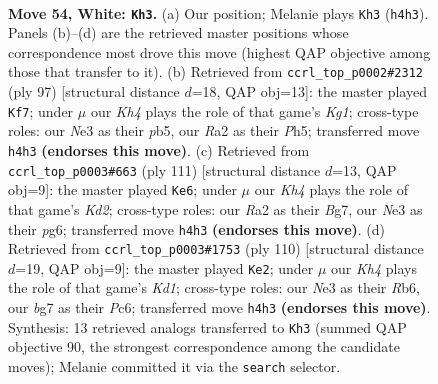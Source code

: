 \documentclass[11pt]{article}
\begin{document}
\clearpage

\begin{figure}[p]\centering
\begin{subfigure}{0.46\textwidth}\centering
\resizebox{\linewidth}{!}{%
\newchessgame
\chessboard[
  setfen={7k/1r4b1/8/8/2P4K/4N3/R7/6R1 w - - 28 54},
  showmover=false,
  pgfstyle=straightmove, color=movearrow, markmove={h4-h3}
]}
\caption{}
\end{subfigure}\hfill
\begin{subfigure}{0.46\textwidth}\centering
\resizebox{\linewidth}{!}{%
\newchessgame
\chessboard[
  setfen={6k1/8/8/1PP3Bp/5K2/8/6r1/8 b - - 0 49},
  showmover=false,
  pgfstyle=straightmove, color=movearrow, markmove={g8-f7}
]}
\caption{}
\end{subfigure}
\\[4pt]
\begin{subfigure}{0.46\textwidth}\centering
\resizebox{\linewidth}{!}{%
\newchessgame
\chessboard[
  setfen={8/3k2b1/6P1/7p/8/R3BK2/8/4r3 b - - 0 56},
  showmover=false,
  pgfstyle=straightmove, color=movearrow, markmove={d7-e6}
]}
\caption{}
\end{subfigure}\hfill
\begin{subfigure}{0.46\textwidth}\centering
\resizebox{\linewidth}{!}{%
\newchessgame
\chessboard[
  setfen={8/8/1RP1b3/2r1k3/8/4P3/8/3K4 w - - 3 56},
  showmover=false,
  pgfstyle=straightmove, color=movearrow, markmove={d1-e2}
]}
\caption{}
\end{subfigure}
\caption{\textbf{Move 54, White: \texttt{Kh3}.} (a) Our position; Melanie plays \texttt{Kh3} (\texttt{h4h3}). Panels (b)--(d) are the retrieved master positions whose correspondence most drove this move (highest QAP objective among those that transfer to it). (b) Retrieved from \texttt{ccrl\_top\_p0002\#2312} (ply 97) [structural distance $d$=18, QAP obj=13]: the master played \texttt{Kf7}; under $\mu$ our \emph{Kh4} plays the role of that game's \emph{Kg1}; cross-type roles: our \emph{N}e3 as their \emph{p}b5, our \emph{R}a2 as their \emph{P}h5; transferred move \texttt{h4h3} \textbf{(endorses this move)}. (c) Retrieved from \texttt{ccrl\_top\_p0003\#663} (ply 111) [structural distance $d$=13, QAP obj=9]: the master played \texttt{Ke6}; under $\mu$ our \emph{Kh4} plays the role of that game's \emph{Kd2}; cross-type roles: our \emph{R}a2 as their \emph{B}g7, our \emph{N}e3 as their \emph{p}g6; transferred move \texttt{h4h3} \textbf{(endorses this move)}. (d) Retrieved from \texttt{ccrl\_top\_p0003\#1753} (ply 110) [structural distance $d$=19, QAP obj=9]: the master played \texttt{Ke2}; under $\mu$ our \emph{Kh4} plays the role of that game's \emph{Kd1}; cross-type roles: our \emph{N}e3 as their \emph{R}b6, our \emph{b}g7 as their \emph{P}c6; transferred move \texttt{h4h3} \textbf{(endorses this move)}. Synthesis: 13 retrieved analogs transferred to \texttt{Kh3} (summed QAP objective 90, the strongest correspondence among the candidate moves); Melanie committed it via the \texttt{search} selector.}
\label{fig:thought-m106}
\end{figure}
\end{document}

